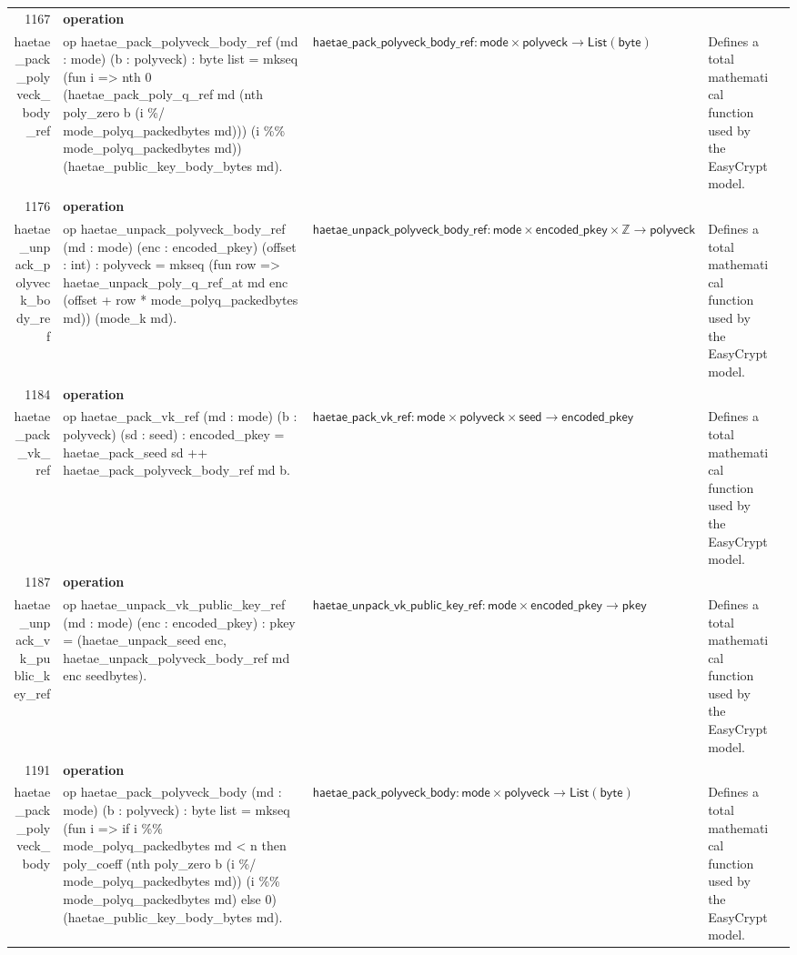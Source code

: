 \documentclass[10pt]{article}
\newcommand{\ec}[1]{\begingroup\ttfamily\scriptsize #1\endgroup}
\begin{document}
\begin{longtable}{r L{0.17\textwidth} L{0.26\textwidth} L{0.27\textwidth} L{0.20\textwidth}}
1167 & \textbf{operation}\\\ec{haetae\_pack\_polyveck\_body\_ref} & \ec{op haetae\_pack\_polyveck\_body\_ref (md : mode) (b : polyveck) : byte list = mkseq (fun i => nth 0 (haetae\_pack\_poly\_q\_ref md (nth poly\_zero b (i \%/ mode\_polyq\_packedbytes md))) (i \%\% mode\_polyq\_packedbytes md)) (haetae\_public\_key\_body\_bytes md).} & \(\mathsf{haetae\_pack\_polyveck\_body\_ref} : \mathsf{mode} \times \mathsf{polyveck} \to \mathsf{List}(\mathsf{byte})\) & Defines a total mathematical function used by the EasyCrypt model. \\
1176 & \textbf{operation}\\\ec{haetae\_unpack\_polyveck\_body\_ref} & \ec{op haetae\_unpack\_polyveck\_body\_ref (md : mode) (enc : encoded\_pkey) (offset : int) : polyveck = mkseq (fun row => haetae\_unpack\_poly\_q\_ref\_at md enc (offset + row * mode\_polyq\_packedbytes md)) (mode\_k md).} & \(\mathsf{haetae\_unpack\_polyveck\_body\_ref} : \mathsf{mode} \times \mathsf{encoded\_pkey} \times \mathbb{Z} \to \mathsf{polyveck}\) & Defines a total mathematical function used by the EasyCrypt model. \\
1184 & \textbf{operation}\\\ec{haetae\_pack\_vk\_ref} & \ec{op haetae\_pack\_vk\_ref (md : mode) (b : polyveck) (sd : seed) : encoded\_pkey = haetae\_pack\_seed sd ++ haetae\_pack\_polyveck\_body\_ref md b.} & \(\mathsf{haetae\_pack\_vk\_ref} : \mathsf{mode} \times \mathsf{polyveck} \times \mathsf{seed} \to \mathsf{encoded\_pkey}\) & Defines a total mathematical function used by the EasyCrypt model. \\
1187 & \textbf{operation}\\\ec{haetae\_unpack\_vk\_public\_key\_ref} & \ec{op haetae\_unpack\_vk\_public\_key\_ref (md : mode) (enc : encoded\_pkey) : pkey = (haetae\_unpack\_seed enc, haetae\_unpack\_polyveck\_body\_ref md enc seedbytes).} & \(\mathsf{haetae\_unpack\_vk\_public\_key\_ref} : \mathsf{mode} \times \mathsf{encoded\_pkey} \to \mathsf{pkey}\) & Defines a total mathematical function used by the EasyCrypt model. \\
1191 & \textbf{operation}\\\ec{haetae\_pack\_polyveck\_body} & \ec{op haetae\_pack\_polyveck\_body (md : mode) (b : polyveck) : byte list = mkseq (fun i => if i \%\% mode\_polyq\_packedbytes md < n then poly\_coeff (nth poly\_zero b (i \%/ mode\_polyq\_packedbytes md)) (i \%\% mode\_polyq\_packedbytes md) else 0) (haetae\_public\_key\_body\_bytes md).} & \(\mathsf{haetae\_pack\_polyveck\_body} : \mathsf{mode} \times \mathsf{polyveck} \to \mathsf{List}(\mathsf{byte})\) & Defines a total mathematical function used by the EasyCrypt model. \\

\end{longtable}
\end{document}
